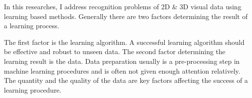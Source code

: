 \documentclass{iitthesis}
\begin{document}
 \label{sec: contribution}

%

In this researches, I address recognition problems of 2D \& 3D visual data using learning based methods. Generally there are two factors determining the result of a learning process. 

The first factor is the learning algorithm. A successful learning algorithm should be effective and robust to unseen data. The second factor determining the learning result is the data. Data preparation usually is a pre-processing step in machine learning procedures and is often not given enough attention relatively. The quantity and the quality of the data are key factors affecting the success of a learning procedure. 
\end{document}
